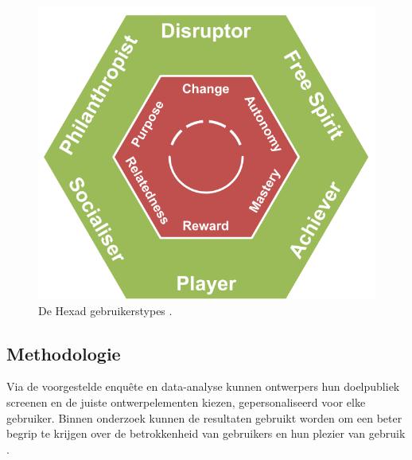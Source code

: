 \begin{figure}
    \includegraphics[width=\linewidth]{HexadUserTypes.png}
    \caption{De Hexad gebruikerstypes \autocite{Tondello2016}.}
    \label{fig:usertypes}
\end{figure}

\subsection{Methodologie}



Via de voorgestelde enquête en data-analyse kunnen ontwerpers hun doelpubliek screenen en de juiste ontwerpelementen kiezen, gepersonaliseerd voor elke gebruiker. Binnen onderzoek kunnen de resultaten gebruikt worden om een beter begrip te krijgen over de betrokkenheid van gebruikers en hun plezier van gebruik \autocite{Tondello2016}.


